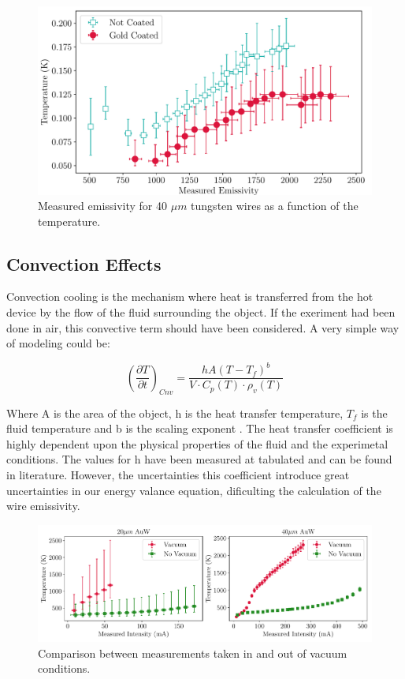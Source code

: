 \begin{figure}[h]
    \centering
    \includegraphics[width=0.8\columnwidth]{EmissivitySummary/EmissivitySummaryPlot.pdf}
    \caption{Measured emissivity for 40 $\mu m$ tungsten wires as a function of the temperature.}
    \label{fig:EmissivityCalculations}
\end{figure}

\subsection{Convection Effects}

Convection cooling is the mechanism where heat is transferred from the hot device by the flow of the fluid surrounding the object. If the exeriment had been done in air, this convective term should have been considered. A very simple way of modeling could be: 

\begin{equation}
    \left(\frac{\partial T}{\partial t}\right)_{Cnv} = \frac{hA\left(T - T_{f} \right)^{b}}{V\cdot C_{p}(T)\cdot \rho_v(T)}
\end{equation}

Where A is the area of the object, h is the heat transfer temperature, $T_f$ is the fluid temperature and b is the scaling exponent \parencite[][]{ref:Convection}. The heat transfer coefficient is highly dependent upon the physical properties of the fluid and the experimetal conditions. The values for h have been measured at tabulated and can be found in literature. However, the uncertainties this coefficient introduce great uncertainties in our energy valance equation, dificulting the calculation of the wire emissivity. 

\begin{figure}[h]
    \centering
    \includegraphics[width=1.0\columnwidth]{Figure_ConvVSnoConv/ConvNotConv.pdf}
    \caption{Comparison between measurements taken in and out of vacuum conditions. }
    \label{fig:ConvectionEffect}
\end{figure}

